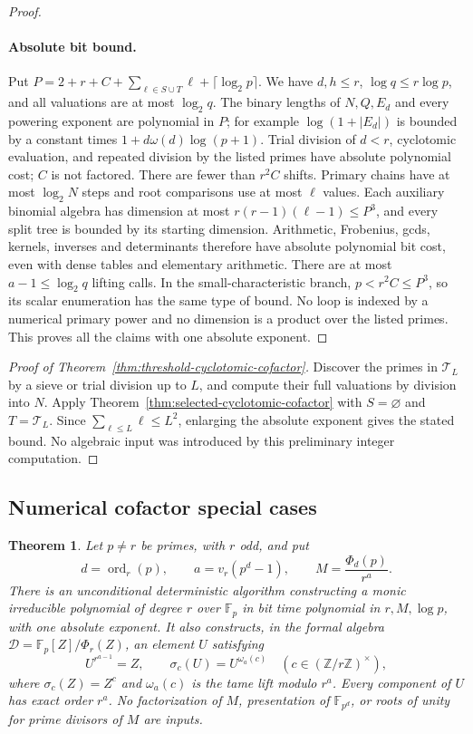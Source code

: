 \documentclass[11pt]{article}
\newtheorem{theorem}{Theorem}[section]
\theoremstyle{definition}
\theoremstyle{remark}
\begin{document}
\begin{proof}
\paragraph{Absolute bit bound.}
Put \(P=2+r+C+\sum_{\ell\in S\cup T}\ell+\lceil\log_2p\rceil\).
We have \(d,h\le r\), \(\log q\le r\log p\), and all
valuations are at most \(\log_2q\). The binary lengths of
\(N,Q,E_d\) and every powering exponent are polynomial in \(P\);
for example \(\log(1+|E_d|)\) is bounded by a constant times
\(1+d\omega(d)\log(p+1)\). Trial division of \(d<r\),
cyclotomic evaluation, and repeated division by the listed primes
have absolute polynomial cost; \(C\) is not factored.
There are fewer than \(r^2C\) shifts. Primary chains have at
most \(\log_2N\) steps and root comparisons use at most \(\ell\)
values. Each auxiliary binomial algebra has dimension at most
\(r(r-1)(\ell-1)\le P^3\), and every split tree is bounded
by its starting dimension. Arithmetic, Frobenius, gcds, kernels,
inverses and determinants therefore have absolute polynomial bit
cost, even with dense tables and elementary arithmetic.
There are at most \(a-1\le\log_2q\) lifting calls.
In the small-characteristic branch, \(p<r^2C\le P^3\), so
its scalar enumeration has the same type of bound.
No loop is indexed by a numerical primary power and no dimension
is a product over the listed primes. This proves all the claims
with one absolute exponent.
\end{proof}

\begin{proof}[Proof of Theorem~\ref{thm:threshold-cyclotomic-cofactor}]
Discover the primes in \(\mathcal T_L\) by a sieve or trial
division up to \(L\), and compute their full valuations by
division into \(N\). Apply Theorem~\ref{thm:selected-cyclotomic-cofactor}
with \(S=\varnothing\) and \(T=\mathcal T_L\).
Since \(\sum_{\ell\le L}\ell\le L^2\), enlarging the
absolute exponent gives the stated bound. No algebraic input
was introduced by this preliminary integer computation.
\end{proof}

\subsection{Numerical cofactor special cases}
\begin{theorem}\label{thm:small-cyclotomic-cofactor}
Let \(p\ne r\) be primes, with \(r\) odd, and put
\[
 d=\operatorname{ord}_r(p),\qquad
 a=v_r(p^d-1),\qquad
 M=\frac{\Phi_d(p)}{r^a}.
\]
There is an unconditional deterministic algorithm constructing
a monic irreducible polynomial of degree \(r\) over
\(\mathbb F_p\) in bit time polynomial in \(r,M,\log p\),
with one absolute exponent. It also constructs, in the formal
algebra \(\mathcal D=\mathbb F_p[Z]/\Phi_r(Z)\), an element
\(U\) satisfying
\[
 U^{r^{a-1}}=Z,\qquad
 \sigma_c(U)=U^{\omega_a(c)}
           \quad(c\in(\mathbb Z/r\mathbb Z)^\times),
\]
where \(\sigma_c(Z)=Z^c\) and \(\omega_a(c)\) is the tame
lift modulo \(r^a\). Every component of \(U\) has exact
order \(r^a\). No factorization of \(M\), presentation of
\(\mathbb F_{p^d}\), or roots of unity for prime divisors of
\(M\) are inputs.
\end{theorem}
\end{document}

